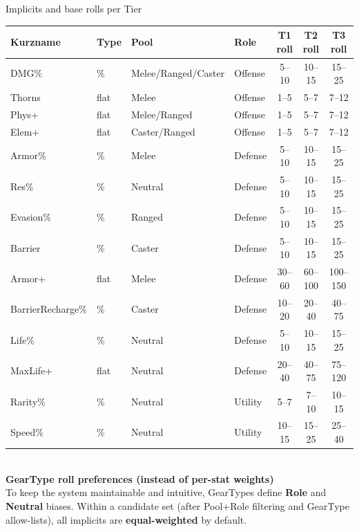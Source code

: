 Implicits and base rolls per Tier \\
\begin{tabular}{|l|l|l|l|c|c|c|}
	\hline
	\textbf{Kurzname} & \textbf{Type} & \textbf{Pool} & \textbf{Role} & \textbf{T1 roll} & \textbf{T2 roll} & \textbf{T3 roll} \\
	\hline
	DMG\%       & \%    & Melee/Ranged/Caster & Offense & 5--10   & 10--15  & 15--25 \\
	Thorns      & flat  & Melee               & Offense & 1--5    & 5--7    & 7--12  \\
	Phys+       & flat  & Melee/Ranged        & Offense & 1--5    & 5--7    & 7--12  \\
	Elem+       & flat  & Caster/Ranged       & Offense & 1--5    & 5--7    & 7--12  \\
	\hline
	Armor\%     & \%    & Melee               & Defense & 5--10   & 10--15  & 15--25 \\
	Res\%       & \%    & Neutral             & Defense & 5--10   & 10--15  & 15--25 \\
	Evasion\%     & \%    & Ranged              & Defense & 5--10   & 10--15  & 15--25 \\
	Barrier     & \%    & Caster              & Defense & 5--10   & 10--15  & 15--25 \\
	Armor+      & flat  & Melee               & Defense & 30--60  & 60--100 & 100--150 \\
	BarrierRecharge\% & \%  & Caster          & Defense & 10--20  & 20--40  & 40--75 \\
	\hline
	Life\%      & \%    & Neutral             & Defense & 5--10   & 10--15  & 15--25 \\
	MaxLife+    & flat  & Neutral             & Defense & 20--40  & 40--75  & 75--120 \\
	\hline
	Rarity\%    & \%    & Neutral             & Utility & 5--7    & 7--10   & 10--15 \\
	Speed\%     & \%    & Neutral             & Utility & 10--15  & 15--25  & 25--40 \\
	\hline
\end{tabular}
\\

\textbf{GearType roll preferences (instead of per-stat weights)}\\
To keep the system maintainable and intuitive, GearTypes define \textbf{Role} and \textbf{Neutral} biases.
Within a candidate set (after Pool+Role filtering and GearType allow-lists), all implicits are \textbf{equal-weighted} by default.

